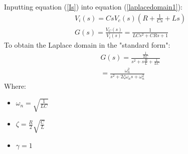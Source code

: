 \documentclass[class=report, crop=false, 12pt,a4paper]{standalone}
\begin{document}
Inputting equation (\ref{Is}) into equation (\ref{laplacedomain1}):
\begin{gather}
  V_i(s) = CsV_c(s) \left(R + \frac{1}{Cs} + Ls\right) \\
  G(s) = \frac{V_C(s)}{V_i(s)} = \frac{1}{LCs^2 + CRs + 1}
\end{gather}
To obtain the Laplace domain in the "standard form":
\begin{gather}
  G(s) = \frac{\frac{1}{LC}}{s^2 + s\frac{R}{L} + \frac{1}{LC}} \\
  = \frac{\omega_n^2}{s^2 + 2\zeta \omega_n s + \omega_n^2}
\end{gather}
Where:
\begin{itemize}
  \item $\omega_n = \sqrt{\frac{1}{LC}}$
  \item $\zeta = \frac{R}{2}\sqrt{\frac{C}{L}}$
  \item $\gamma = 1$
\end{itemize}
\end{document}
